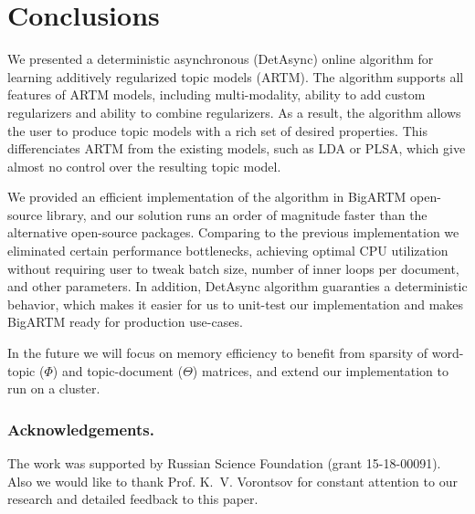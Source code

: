 \documentclass[russian,english]{llncs}
\newcommand{\kw}[1]{\mbox{\textsf{#1}}}
\begin{document}
\section{Conclusions}
\label{sec:Conclusions}

We presented a deterministic asynchronous (\kw{DetAsync}) online algorithm for learning
additively regularized topic models (ARTM).
The algorithm supports all features of ARTM models,
including multi-modality, ability to add custom regularizers and
ability to combine regularizers.
As a result, the algorithm allows the user to produce topic models with a rich set of desired properties.
This differenciates ARTM from the existing models, such as LDA or PLSA,
which give almost no control over the resulting topic model.

We provided an efficient implementation of the algorithm in BigARTM open-source library,
and our solution runs an order of magnitude faster than
the alternative open-source packages.
Comparing to the previous implementation we
eliminated certain performance bottlenecks,
achieving optimal CPU utilization without requiring user
to tweak batch size, number of inner loops per document, and other parameters.
In addition, \kw{DetAsync} algorithm guaranties a deterministic behavior,
which makes it easier for us to unit-test our implementation
and makes BigARTM ready for production use-cases.

In the future we will focus on memory efficiency
to benefit from sparsity of word-topic ($\Phi$) and topic-document ($\Theta$) matrices,
and extend our implementation to run on a cluster.

\bigskip
\subsubsection*{Acknowledgements.}
\nopagebreak
The work was supported by Russian Science Foundation (grant 15-18-00091).
Also we would like to thank Prof. K.~V. Vorontsov for constant attention to our research
and detailed feedback to this paper.

%
%
\end{document}
